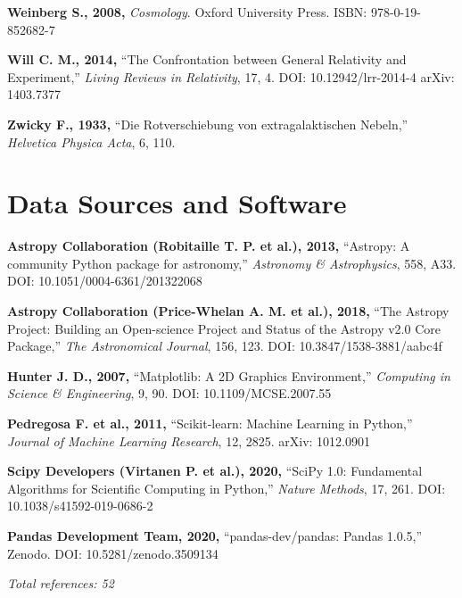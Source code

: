 \documentclass[11pt,a4paper]{article}
\begin{document}
\textbf{Weinberg S., 2008,} \emph{Cosmology}. Oxford University Press.
ISBN: 978-0-19-852682-7

\textbf{Will C. M., 2014,} ``The Confrontation between General
Relativity and Experiment,'' \emph{Living Reviews in Relativity}, 17, 4.
DOI: 10.12942/lrr-2014-4 arXiv: 1403.7377

\textbf{Zwicky F., 1933,} ``Die Rotverschiebung von extragalaktischen
Nebeln,'' \emph{Helvetica Physica Acta}, 6, 110.

\hypertarget{data-sources-and-software}{%
\section*{Data Sources and Software}\label{data-sources-and-software}}

\textbf{Astropy Collaboration (Robitaille T. P. et al.), 2013,}
``Astropy: A community Python package for astronomy,'' \emph{Astronomy
\& Astrophysics}, 558, A33. DOI: 10.1051/0004-6361/201322068

\textbf{Astropy Collaboration (Price-Whelan A. M. et al.), 2018,} ``The
Astropy Project: Building an Open-science Project and Status of the
Astropy v2.0 Core Package,'' \emph{The Astronomical Journal}, 156, 123.
DOI: 10.3847/1538-3881/aabc4f

\textbf{Hunter J. D., 2007,} ``Matplotlib: A 2D Graphics Environment,''
\emph{Computing in Science \& Engineering}, 9, 90. DOI:
10.1109/MCSE.2007.55

\textbf{Pedregosa F. et al., 2011,} ``Scikit-learn: Machine Learning in
Python,'' \emph{Journal of Machine Learning Research}, 12, 2825. arXiv:
1012.0901

\textbf{Scipy Developers (Virtanen P. et al.), 2020,} ``SciPy 1.0:
Fundamental Algorithms for Scientific Computing in Python,''
\emph{Nature Methods}, 17, 261. DOI: 10.1038/s41592-019-0686-2

\textbf{Pandas Development Team, 2020,} ``pandas-dev/pandas: Pandas
1.0.5,'' Zenodo. DOI: 10.5281/zenodo.3509134

\emph{Total references: 52}
\end{document}
